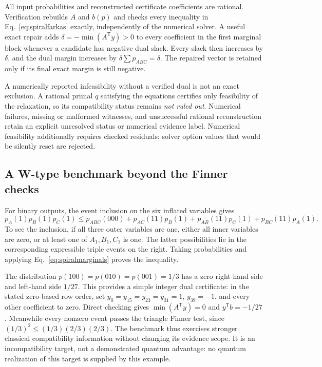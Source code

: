 All input probabilities and reconstructed certificate coefficients are
rational. Verification rebuilds $A$ and $b(p)$ and checks every inequality
in Eq.~\eqref{eq:spiralfarkas} exactly, independently of the numerical
solver. A useful exact repair adds $\delta=-\min(A^{\mathsf T}y)>0$ to
every coefficient in the first marginal block whenever a candidate has
negative dual slack. Every slack then increases by $\delta$, and the dual
margin increases by $\delta\sum p_{ABC}=\delta$. The repaired vector is
retained only if its final exact margin is still negative.

A numerically reported infeasibility without a verified dual is not an
exact exclusion. A rational primal $q$ satisfying the equations certifies
only feasibility of the relaxation, so its compatibility status remains
\emph{not ruled out}. Numerical failures, missing or malformed witnesses, and unsuccessful
rational reconstruction retain an explicit unresolved status or numerical
evidence label. Numerical feasibility additionally requires checked residuals;
solver option values that would be silently reset are rejected.

\subsection{A W-type benchmark beyond the Finner checks}
For binary outputs, the event inclusion on the six inflated variables gives
\begin{equation}
 p_A(1)p_B(1)p_C(1)\leq p_{ABC}(000)
 +p_{AC}(11)p_B(1)+p_{AB}(11)p_C(1)+p_{BC}(11)p_A(1).
 \label{eq:spiralw}
\end{equation}
To see the inclusion, if all three outer variables are one, either all
inner variables are zero, or at least one of $A_1,B_1,C_1$ is one. The
latter possibilities lie in the corresponding expressible triple events
on the right. Taking probabilities and applying
Eq.~\eqref{eq:spiralmarginals} proves the inequality.

The distribution $p(100)=p(010)=p(001)=1/3$ has a zero right-hand side and
left-hand side $1/27$. This provides a simple integer dual certificate:
in the stated zero-based row order, set $y_0=y_{15}=y_{23}=y_{31}=1$,
$y_{39}=-1$, and every other coefficient to zero. Direct checking gives
$\min(A^{\mathsf T}y)=0$ and $y^{\mathsf T}b=-1/27$.
Meanwhile every nonzero event passes the triangle Finner test, since
$(1/3)^2\leq(1/3)(2/3)(2/3)$. The benchmark thus exercises
stronger classical compatibility information without changing its evidence
scope. It is an incompatibility target, not a demonstrated quantum advantage:
no quantum realization of this target is supplied by this example.


